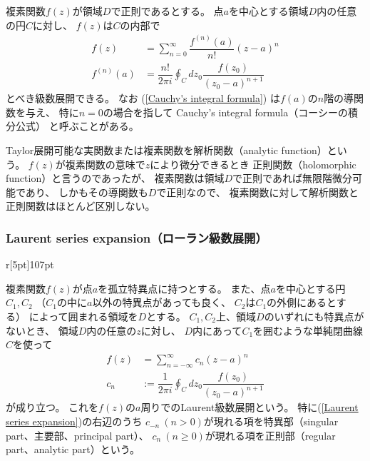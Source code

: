 複素関数$f(z)$が領域$D$で正則であるとする。
点$a$を中心とする領域$D$内の任意の円$C$に対し、
$f(z)$は$C$の内部で
\begin{subequations}
\begin{align}
    f(z)
    &=
    \sum_{n=0}^{\infty}
    \dfrac{f^{(n)}(a)}{n!}
    (z-a)^n
\\
    f^{(n)}(a)
    &=
    \dfrac{n!}{2 \pi i}
    \oint_C dz_0\dfrac{f(z_0)}{(z_0 - a)^{n+1}}
\label{Cauchy's integral formula}
\end{align}
\end{subequations}
とべき級数展開できる。
なお
(\ref{Cauchy's integral formula})
は$f(a)$の$n$階の導関数を与え、
特に$n=0$の場合を指して
Cauchy's integral formula（コーシーの積分公式）
と呼ぶことがある。

Taylor展開可能な実関数または複素関数を解析関数（analytic function）という。
$f(z)$が複素関数の意味で$z$により微分できるとき
正則関数（holomorphic function）と言うのであったが、
複素関数は領域$D$で正則であれば無限階微分可能であり、
しかもその導関数も$D$で正則なので、
複素関数に対して解析関数と正則関数はほとんど区別しない。

\subsubsection{Laurent series expansion（ローラン級数展開）}

\begin{wrapfigure}[7]{r}[5pt]{107pt}
  \centering
  
\end{wrapfigure}
複素関数$f(z)$が点$a$を孤立特異点に持つとする。
また、点$a$を中心とする円$C_1, C_2$
（$C_1$の中に$a$以外の特異点があっても良く、
$C_2$は$C_1$の外側にあるとする）
によって囲まれる領域を$D$とする。
$C_1, C_2$上、領域$D$のいずれにも特異点がないとき、
領域$D$内の任意の$z$に対し、
$D$内にあって$C_1$を囲むような単純閉曲線$C$を使って
\begin{subequations}
\begin{align}
    f(z)
    &= \sum_{n=-\infty}^{\infty}
        c_n (z-a)^n
\label{Laurent series expansion}
\\
    c_n
    &:= \dfrac{1}{2 \pi i}
    \oint_C dz_0 \dfrac{f(z_0)}{(z_0 - a)^{n+1}}
\end{align}
\end{subequations}
が成り立つ。
これを$f(z)$の$a$周りでのLaurent級数展開という。
特に(\ref{Laurent series expansion})の右辺のうち
$c_{-n}\ (n > 0)$が現れる項を特異部（singular part、主要部、principal part）、
$c_{n}\ (n \ge 0)$が現れる項を正則部（regular part、analytic part）という。

